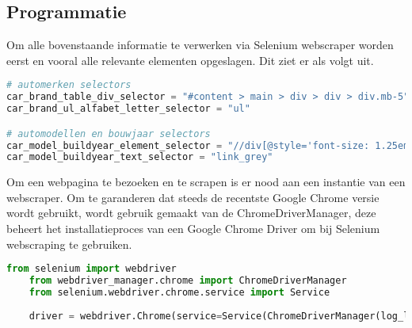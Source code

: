 \subsection{Programmatie}
Om alle bovenstaande informatie te verwerken via Selenium webscraper worden eerst en vooral alle relevante elementen opgeslagen.
Dit ziet er als volgt uit.
\begin{lstlisting}[language=Python, caption=Python houdt constanten bij van alle css selectors om elementen te vinden op de webpagina's, label={lst:selectors}, breaklines=true, showstringspaces=false]
# automerken selectors
car_brand_table_div_selector = "#content > main > div > div > div.mb-5"
car_brand_ul_alfabet_letter_selector = "ul"

# automodellen en bouwjaar selectors
car_model_buildyear_element_selector = "//div[@style='font-size: 1.25em; margin: 10px !important;']"
car_model_buildyear_text_selector = "link_grey"
\end{lstlisting}

Om een webpagina te bezoeken en te scrapen is er nood aan een instantie van een webscraper. Om te garanderen dat steeds de recentste Google Chrome versie wordt gebruikt, wordt gebruik gemaakt van de ChromeDriverManager, deze beheert het installatieproces van een Google Chrome Driver om bij Selenium webscraping te gebruiken. 
\begin{lstlisting}[language=Python, caption=Python declaratie en initialisatie Selenium webscraper, breaklines=true, showstringspaces=false]
	from selenium import webdriver
	from webdriver_manager.chrome import ChromeDriverManager
	from selenium.webdriver.chrome.service import Service
	
	driver = webdriver.Chrome(service=Service(ChromeDriverManager(log_level=0).install()))
\end{lstlisting}

